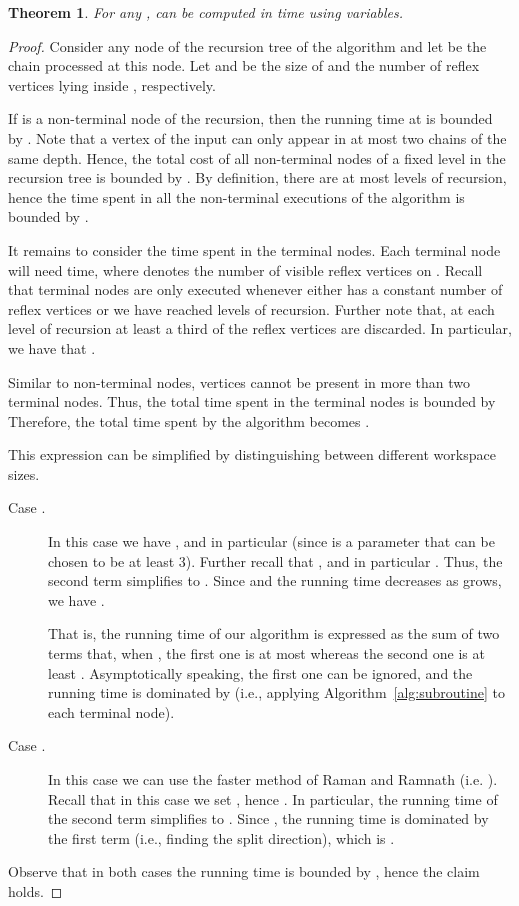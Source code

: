 \documentclass[a4paper]{article}
\newtheorem{theorem}{Theorem}
\begin{document}
\begin{theorem}\label{theo_determ}
For any ,  can be computed in   time using  variables.
\end{theorem}
\begin{proof}
Consider any node  of the recursion tree of the algorithm and let  be the chain processed at this node. Let  and  be the size of  and the number of reflex vertices lying inside , respectively.

If  is a non-terminal node of the recursion, then the running time at  is bounded by . 
Note that a vertex of the input can only appear in at most two chains of the same depth. Hence, the total cost of all non-terminal nodes of a fixed level  in the recursion tree is bounded by . By definition, there are at most  levels of recursion, hence the time spent in all the non-terminal executions of the algorithm is bounded by .

It remains to consider the time spent in the terminal nodes. Each terminal node  will need  time, where  denotes the number of visible reflex vertices on . Recall that terminal nodes are only executed whenever either  has a constant number of reflex vertices or we have reached  levels of recursion. Further note that, at each level of recursion at least a third of the reflex vertices are discarded. In particular, we have that . 

Similar to non-terminal nodes, vertices cannot be present in more than two terminal nodes. Thus, the total time spent in the terminal nodes is bounded by  Therefore, the total time spent by the algorithm becomes  . 

This expression can be simplified by distinguishing between different workspace sizes. 

\begin{description}
\item[Case .] In this case we have , and in particular  (since  is a parameter that can be chosen to be at least 3). Further recall that , and in particular  . Thus, the second term simplifies to . 
Since  and the running time decreases as  grows, we have   . 

That is, the running time of our algorithm is expressed as the sum of two terms that, when , the first one is at most  whereas the second one is at least . Asymptotically speaking, the first one can be ignored, and the running time is dominated by  (i.e., applying Algorithm~\ref{alg:subroutine} to each terminal node). 
\item[Case .] In this case we can use the faster method of Raman and Ramnath (i.e. ). Recall that in this case we set , hence  . In particular, the running time of the second term simplifies to . Since  , the running time is dominated by the first term (i.e., finding the split direction), which is . 
\end{description}
Observe that in both cases the running time is bounded by , hence the claim holds. 
\end{proof}
\end{document}
